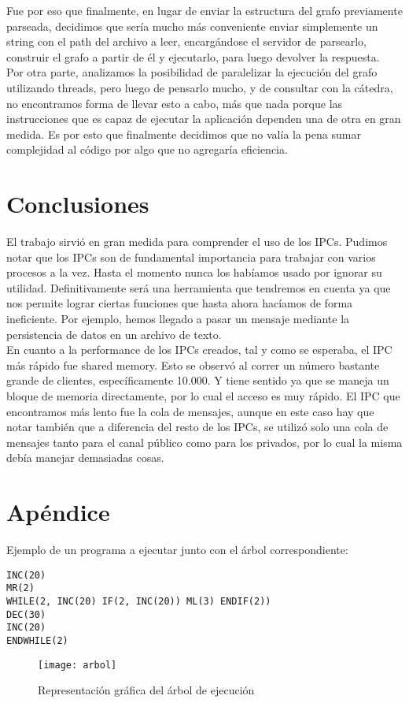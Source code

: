 \documentclass[a4paper, 10pt]{article}
\begin{document}
Fue por eso que finalmente, en lugar de enviar la estructura del grafo previamente parseada, decidimos que sería mucho más conveniente enviar simplemente un string con el path del archivo a leer, encargándose el servidor de parsearlo, construir el grafo a partir de él y ejecutarlo, para luego devolver la respuesta.\\

Por otra parte, analizamos la posibilidad de paralelizar la ejecución del grafo utilizando threads, pero luego de pensarlo mucho, y de consultar con la cátedra, no encontramos forma de llevar esto a cabo, más que nada porque las instrucciones que es capaz de ejecutar la aplicación dependen una de otra en gran medida. Es por esto que finalmente decidimos que no valía la pena sumar complejidad al código por algo que no agregaría eficiencia. \\

\section{Conclusiones}

El trabajo sirvió en gran medida para comprender el uso de los IPCs. Pudimos notar que los IPCs son de fundamental importancia para trabajar con varios procesos a la vez. Hasta el momento nunca los habíamos usado por ignorar su utilidad. Definitivamente será una herramienta que tendremos en cuenta ya que nos permite lograr ciertas funciones que hasta ahora hacíamos de forma ineficiente. Por ejemplo, hemos llegado a pasar un mensaje mediante la persistencia de datos en un archivo de texto.\\

En cuanto a la performance de los IPCs creados, tal y como se esperaba, el IPC más rápido fue shared memory. Esto se observó al correr un número bastante grande de clientes, específicamente 10.000. Y tiene sentido ya que se maneja un bloque de memoria directamente, por lo cual el acceso es muy rápido. El IPC que encontramos más lento fue la cola de mensajes, aunque en este caso hay que notar también que a diferencia del resto de los IPCs, se utilizó solo una cola de mensajes tanto para el canal público como para los privados, por lo cual la misma debía manejar demasiadas cosas.\\

\newpage
\section{Apéndice}
\label{apendice}

Ejemplo de un programa a ejecutar junto con el árbol correspondiente:\\

\begin{lstlisting}
INC(20)
MR(2)
WHILE(2, INC(20) IF(2, INC(20)) ML(3) ENDIF(2))
DEC(30)
INC(20)
ENDWHILE(2)
\end{lstlisting}
\vspace{1.5em}

\begin{figure}[h]
\centering
\texttt{[image: arbol]}
\caption{Representación gráfica del árbol de ejecución}
\noindent
\end{figure}
\end{document}
